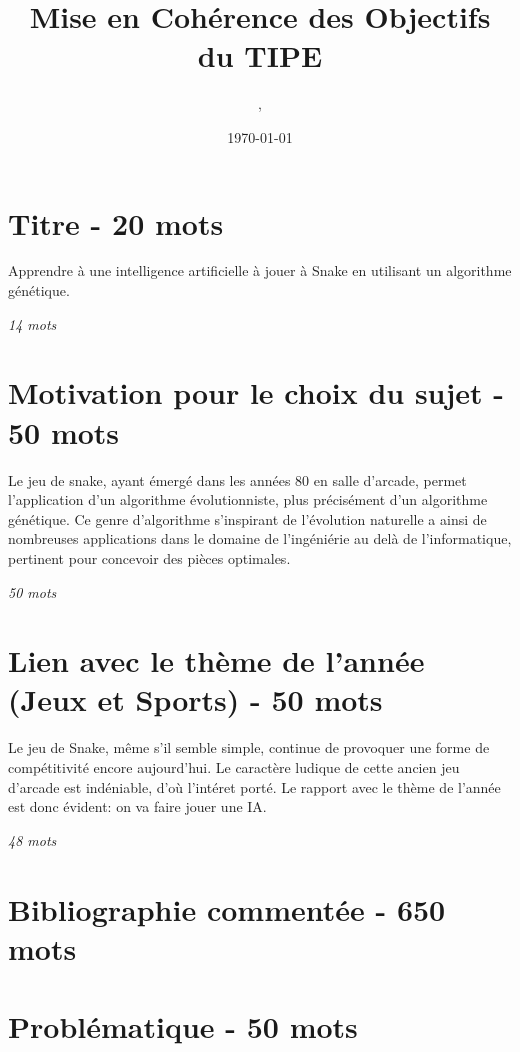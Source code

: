 \documentclass[11pt,a4paper]{article}
\author{\monNom, \maClasse}
\title{Mise en Cohérence des Objectifs du TIPE}
\date{\today}
\makeatletter
\renewcommand{\maketitle}{
  \thispagestyle{empty}
  \begin{center}
  \shadowbox{\parbox{5in}{%
     \centering%
     \textrm{\textbf{\Large \@title}}\\
     \vspace{0.2cm}
     \textrm{\large \@author}\\
     \vspace{0.2cm}
     \textrm{\large \@date}
  }} 
  \end{center}
  \null
}
\makeatother
\begin{document}
\maketitle

\tableofcontents

\thispagestyle{fancy}

\section{Titre - 20 mots}

\begin{center}
    Apprendre à une intelligence artificielle à jouer à Snake en utilisant un algorithme génétique.
\end{center}

\textit{14 mots}

\section{Motivation pour le choix du sujet - 50 mots}

Le jeu de snake, ayant émergé dans les années 80 en salle d'arcade,
permet l'application d'un algorithme évolutionniste, 
plus précisément d'un algorithme génétique.
Ce genre d'algorithme s'inspirant de l'évolution naturelle a ainsi de 
nombreuses applications dans le domaine de l'ingéniérie au delà de l'informatique, 
pertinent pour concevoir des pièces optimales.

\textit{50 mots}

\section{Lien avec le thème de l'année (Jeux et Sports) - 50 mots}

Le jeu de Snake, même s'il semble simple, continue de provoquer 
une forme de compétitivité encore aujourd'hui. 
Le caractère ludique de cette ancien jeu d'arcade est 
indéniable, d'où l'intéret porté.
Le rapport avec le thème de l'année est donc évident: on va
faire jouer une IA.

\textit{48 mots}

\section{Bibliographie commentée - 650 mots}

\section{Problématique - 50 mots}
\end{document}
